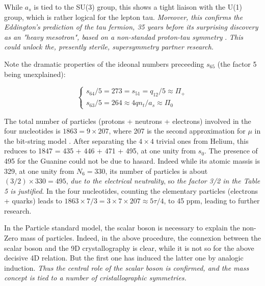 \documentclass[a4paper,9pt]{article}
\begin{document}
 
While $a_s$ is tied to the SU(3) group, this shows a tight liaison with the U(1) group, which is rather logical for the lepton tau. \textit {Moreover, this confirms the Eddington's prediction of the tau fermion, 35 years before its surprising discovery as an "heavy mesotron", based on a non-standad proton-tau symmetry} \cite{Eddington}. \textit{This could unlock the, presently sterile, supersymmetry partner research}.

Note the dramatic properties of the ideonal numbers preceeding $s_{65}$ (the factor 5 being unexplained):

\begin{equation}
 \left\{
    \begin{array}{ll} 
           s_{64}/5 = 273 = s_{51} = q_{12}/5 \approx \Pi_+\\
            s_{63}/5 = 264 \approx 4qn_t/a_s \approx \Pi_0 
    \end{array}
\right.
\end{equation}
 
The total number of particles (protons + neutrons + electrons) involved in the four nucleotides is $1863 = 9\times 207$, where 207 is the second approximation for $\mu$ in the bit-string model \cite{Noyes}. After separating the $4\times4$ trivial ones from Helium, this reduces to 1847 = 435 + 446 + 471 + 495, at one unity from $s_0$. The presence of 495 for the Guanine could not be due to hasard. Indeed while its atomic massis is 329, at one unity from $N_6 = 330$, its number of particles is about $(3/2) \times 330 = 495$, \textit {due to the electrical neutrality}, so \textit {the factor 3/2 in the Table 5 is justified}. In the four nucleotides, counting the elementary particles (electrons + quarks) leads to $1863 \times 7/3 = 3 \times 7 \times 207 \approx 5\tau/4$, to 45 ppm, leading to further research.


In the Particle standard  model, the scalar boson is necessary to explain the non-Zero mass of particles. Indeed, in the above procedure, the connexion between the scalar boson and the 9D crystallography is clear, while it is not so for the above decisive 4D relation. But the first one has induced the latter one by analogic induction. \textit{Thus the central role of the scalar boson is confirmed, and the mass concept is tied to a number of cristallographic symmetries.} 
\end{document}
